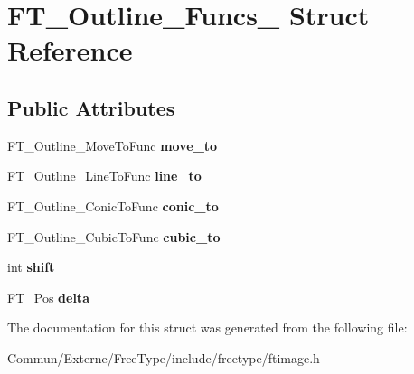 \hypertarget{struct_f_t___outline___funcs__}{}\section{F\+T\+\_\+\+Outline\+\_\+\+Funcs\+\_\+ Struct Reference}
\label{struct_f_t___outline___funcs__}
\subsection*{Public Attributes}
\begin{DoxyCompactItemize}
\item 
F\+T\+\_\+\+Outline\+\_\+\+Move\+To\+Func {\bfseries move\+\_\+to}\hypertarget{struct_f_t___outline___funcs___abd53463a59a1ae2c6998e619c2ab6a65}{}\label{struct_f_t___outline___funcs___abd53463a59a1ae2c6998e619c2ab6a65}

\item 
F\+T\+\_\+\+Outline\+\_\+\+Line\+To\+Func {\bfseries line\+\_\+to}\hypertarget{struct_f_t___outline___funcs___a876fc8ca7541786cd3c4ec3806f88360}{}\label{struct_f_t___outline___funcs___a876fc8ca7541786cd3c4ec3806f88360}

\item 
F\+T\+\_\+\+Outline\+\_\+\+Conic\+To\+Func {\bfseries conic\+\_\+to}\hypertarget{struct_f_t___outline___funcs___a09681f5a64189066d3fba3cf398a135b}{}\label{struct_f_t___outline___funcs___a09681f5a64189066d3fba3cf398a135b}

\item 
F\+T\+\_\+\+Outline\+\_\+\+Cubic\+To\+Func {\bfseries cubic\+\_\+to}\hypertarget{struct_f_t___outline___funcs___aa3e0c1bacb181a5f43c104ab7f72cfda}{}\label{struct_f_t___outline___funcs___aa3e0c1bacb181a5f43c104ab7f72cfda}

\item 
int {\bfseries shift}\hypertarget{struct_f_t___outline___funcs___a540c246669b21b86cb405b3d9019cfda}{}\label{struct_f_t___outline___funcs___a540c246669b21b86cb405b3d9019cfda}

\item 
F\+T\+\_\+\+Pos {\bfseries delta}\hypertarget{struct_f_t___outline___funcs___a3c3121398b3ff564b4f3fd5b2a318e5e}{}\label{struct_f_t___outline___funcs___a3c3121398b3ff564b4f3fd5b2a318e5e}

\end{DoxyCompactItemize}


The documentation for this struct was generated from the following file\+:\begin{DoxyCompactItemize}
\item 
Commun/\+Externe/\+Free\+Type/include/freetype/ftimage.\+h\end{DoxyCompactItemize}
